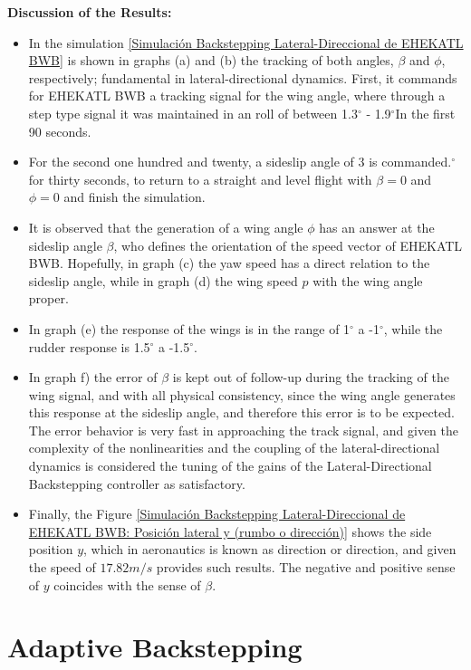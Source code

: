 \textbf{Discussion of the Results:}
\begin{itemize}
    \item In the simulation \ref{Simulación Backstepping Lateral-Direccional de EHEKATL BWB} is shown in graphs (a) and (b) the tracking of both angles, $\beta$ and $\phi$, respectively; fundamental in lateral-directional dynamics. First, it commands for EHEKATL BWB a tracking signal for the wing angle, where through a step type signal it was maintained in an roll of between 1.3$^\circ$ - 1.9$^\circ$In the first 90 seconds.
    \item For the second one hundred and twenty, a sideslip angle of 3 is commanded.$^\circ$ for thirty seconds, to return to a straight and level flight with $\beta=0$ and $\phi=0$ and finish the simulation.
    \item It is observed that the generation of a wing angle $\phi$ has an answer at the sideslip angle $\beta$, who defines the orientation of the speed vector of EHEKATL BWB. Hopefully, in graph (c) the yaw speed has a direct relation to the sideslip angle, while in graph (d) the wing speed $p$ with the wing angle proper. 
    \item In graph (e) the response of the wings is in the range of 1$^\circ$ a -1$^\circ$, while the rudder response is 1.5$^\circ$ a -1.5$^\circ$.
    \item In graph f) the error of $\beta$ is kept out of follow-up during the tracking of the wing signal, and with all physical consistency, since the wing angle generates this response at the sideslip angle, and therefore this error is to be expected. The error behavior is very fast in approaching the track signal, and given the complexity of the nonlinearities and the coupling of the lateral-directional dynamics is considered the tuning of the gains of the Lateral-Directional Backstepping controller as satisfactory. 
    \item Finally, the Figure \ref{Simulación Backstepping Lateral-Direccional de EHEKATL BWB: Posición lateral y (rumbo o dirección)} shows the side position $y$, which in aeronautics is known as direction or direction, and given the speed of $17.82 m/s$ provides such results. The negative and positive sense of $y$ coincides with the sense of $\beta$. 
\end{itemize}


\section{Adaptive Backstepping}

